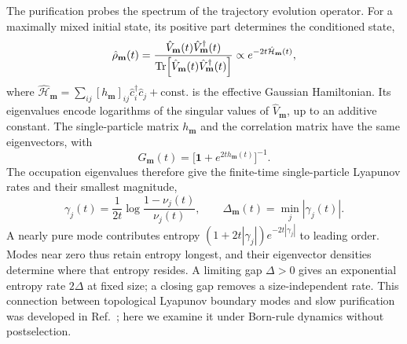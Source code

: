 \documentclass[aps,prb,10pt,twocolumn,superscriptaddress,longbibliography,floatfix]{revtex4-2}
\newcommand{\rec}{\mathbf m}   %
\begin{document}
{The purification probes the spectrum of the trajectory evolution operator. For a maximally mixed initial state, its positive part determines the conditioned state,
\begin{equation}
 \hat\rho_{\rec}(t)=\frac{\hat V_{\rec}(t)\hat V_{\rec}^\dagger(t)}
 {\Tr[\hat V_{\rec}(t)\hat V_{\rec}^\dagger(t)]}
 \propto e^{-2t\hat{\mathcal H}_{\rec}(t)},
 \label{eq:PurificationKrausProduct}
\end{equation}
where $\hat{\mathcal H}_{\rec}=\sum_{ij}[h_{\rec}]_{ij}\hat c_i^\dagger\hat c_j+\mathrm{const.}$ is the effective Gaussian Hamiltonian. Its eigenvalues encode logarithms of the singular values of $\hat V_{\rec}$, up to an additive constant. The single-particle matrix $h_{\rec}$ and the correlation matrix have the same eigenvectors, with
\begin{equation}
 G_{\rec}(t)=\big[\mathbf{1}+e^{2t h_{\rec}(t)}\big]^{-1}.
 \label{eq:PurificationFermiFunction}
\end{equation}
The occupation eigenvalues therefore give the finite-time single-particle Lyapunov rates and their smallest magnitude,
\begin{equation}
 \gamma_j(t)=\frac{1}{2t}\log\frac{1-\nu_j(t)}{\nu_j(t)},\qquad
 \Delta_{\rec}(t)=\min_j|\gamma_j(t)|.
 \label{eq:LyapunovFromOccupations}
\end{equation}
A nearly pure mode contributes entropy $(1+2t|\gamma_j|)e^{-2t|\gamma_j|}$ to leading order. Modes near zero thus retain entropy longest, and their eigenvector densities determine where that entropy resides. A limiting gap $\Delta>0$ gives an exponential entropy rate $2\Delta$ at fixed size; a closing gap removes a size-independent rate. This connection between topological Lyapunov boundary modes and slow purification was developed in Ref.~\cite{XiaoKawabata2026}; here we examine it under Born-rule dynamics without postselection.

}
\end{document}
